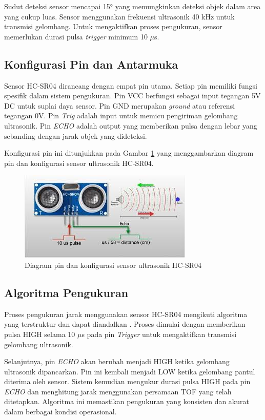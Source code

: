 Sudut deteksi sensor mencapai 15° yang memungkinkan deteksi objek dalam area yang cukup luas. Sensor menggunakan frekuensi ultrasonik 40 kHz untuk transmisi gelombang. Untuk mengaktifkan proses pengukuran, sensor memerlukan durasi pulsa \textit{trigger} minimum 10 $\mu$s.

\subsection{Konfigurasi Pin dan Antarmuka}
Sensor HC-SR04 dirancang dengan empat pin utama. Setiap pin memiliki fungsi spesifik dalam sistem pengukuran. Pin VCC berfungsi sebagai input tegangan 5V DC untuk suplai daya sensor. Pin GND merupakan \textit{ground} atau referensi tegangan 0V. Pin \textit{Trig} adalah input untuk memicu pengiriman gelombang ultrasonik. Pin \textit{ECHO} adalah output yang memberikan pulsa dengan lebar yang sebanding dengan jarak objek yang dideteksi. 

Konfigurasi pin ini ditunjukkan pada Gambar \ref{fig:teori-figure-2} yang menggambarkan diagram pin dan konfigurasi sensor ultrasonik HC-SR04.

\begin{figure}
    \centering
    \includegraphics[width=0.5\linewidth]{images/hcsr.jpg}
    \caption{Diagram pin dan konfigurasi sensor ultrasonik HC-SR04}
    \label{fig:teori-figure-2}
\end{figure}

\subsection{Algoritma Pengukuran}
Proses pengukuran jarak menggunakan sensor HC-SR04 mengikuti algoritma yang terstruktur dan dapat diandalkan \citep{rohman2021aplikasi}. Proses dimulai dengan memberikan pulsa HIGH selama 10 $\mu$s pada pin \textit{Trigger} untuk mengaktifkan transmisi gelombang ultrasonik. 

Selanjutnya, pin \textit{ECHO} akan berubah menjadi HIGH ketika gelombang ultrasonik dipancarkan. Pin ini kembali menjadi LOW ketika gelombang pantul diterima oleh sensor. Sistem kemudian mengukur durasi pulsa HIGH pada pin \textit{ECHO} dan menghitung jarak menggunakan persamaan TOF yang telah ditetapkan. Algoritma ini memastikan pengukuran yang konsisten dan akurat dalam berbagai kondisi operasional.

